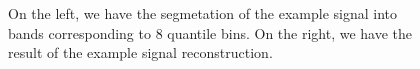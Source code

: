 \begin{figure}
	\centering
	\caption{On the left, we have the segmetation of the example signal into bands corresponding to 8 quantile bins. On the right, we have the result of the example signal reconstruction.}
	\label{fig:method:mtf_signals}
\end{figure}
